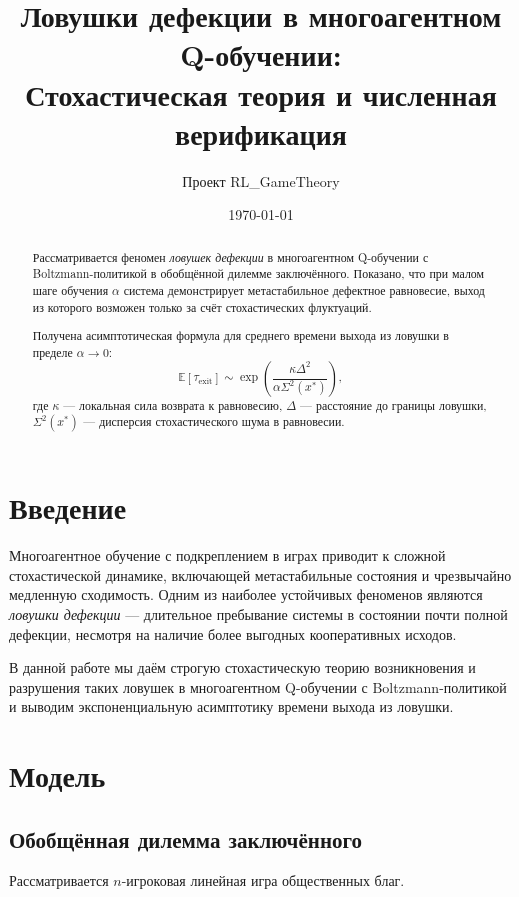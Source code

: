\documentclass[12pt,a4paper]{article}
\title{Ловушки дефекции в многоагентном Q-обучении:\\
Стохастическая теория и численная верификация}
\author{Проект RL\_GameTheory}
\date{\today}
\theoremstyle{definition}
\begin{document}
\maketitle

\begin{abstract}
Рассматривается феномен \emph{ловушек дефекции} в многоагентном Q-обучении
с Boltzmann-политикой в обобщённой дилемме заключённого.
Показано, что при малом шаге обучения $\alpha$ система демонстрирует
метастабильное дефектное равновесие, выход из которого возможен
только за счёт стохастических флуктуаций.

Получена асимптотическая формула для среднего времени выхода из ловушки
в пределе $\alpha \to 0$:
\[
\mathbb{E}[\tau_{\mathrm{exit}}]
\sim
\exp\!\left(
\frac{\kappa \Delta^2}{\alpha \Sigma^2(x^*)}
\right),
\]
где $\kappa$ — локальная сила возврата к равновесию,
$\Delta$ — расстояние до границы ловушки,
$\Sigma^2(x^*)$ — дисперсия стохастического шума в равновесии.
\end{abstract}

\section{Введение}

Многоагентное обучение с подкреплением в играх приводит
к сложной стохастической динамике, включающей
метастабильные состояния и чрезвычайно медленную сходимость.
Одним из наиболее устойчивых феноменов являются
\emph{ловушки дефекции} — длительное пребывание системы
в состоянии почти полной дефекции,
несмотря на наличие более выгодных кооперативных исходов.

В данной работе мы даём строгую стохастическую теорию
возникновения и разрушения таких ловушек
в многоагентном Q-обучении с Boltzmann-политикой
и выводим экспоненциальную асимптотику
времени выхода из ловушки.

\section{Модель}

\subsection{Обобщённая дилемма заключённого}

Рассматривается $n$-игроковая линейная игра общественных благ.
\end{document}
